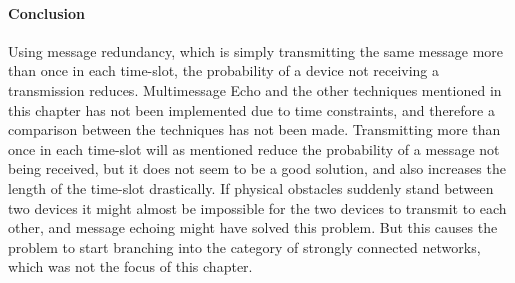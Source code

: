 \paragraph{Conclusion}
Using message redundancy, which is simply transmitting the same message more than once in each time-slot, the probability of a device not receiving a transmission reduces.
Multimessage Echo and the other techniques mentioned in this chapter has not been implemented due to time constraints, and therefore a comparison between the techniques has not been made.
Transmitting more than once in each time-slot will as mentioned reduce the probability of a message not being received, but it does not seem to be a good solution, and also increases the length of the time-slot drastically.
If physical obstacles suddenly stand between two devices it might almost be impossible for the two devices to transmit to each other, and message echoing might have solved this problem.
But this causes the problem to start branching into the category of strongly connected networks, which was not the focus of this chapter.